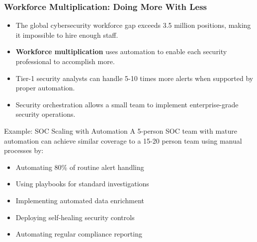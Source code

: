\documentclass{beamer}
\begin{document}
\begin{frame}
  \frametitle{Workforce Multiplication: Doing More With Less}
  
  \begin{itemize}
    \item The global cybersecurity workforce gap exceeds 3.5 million positions, making it impossible to hire enough staff.
    \item \textbf{Workforce multiplication} uses automation to enable each security professional to accomplish more.
    \item Tier-1 security analysts can handle 5-10 times more alerts when supported by proper automation.
    \item Security orchestration allows a small team to implement enterprise-grade security operations.
  \end{itemize}
  
  \begin{exampleblock}{Example: SOC Scaling with Automation}
    \scriptsize
    A 5-person SOC team with mature automation can achieve similar coverage to a 15-20 person team using manual processes by:
    \begin{itemize}
      \item Automating 80\% of routine alert handling
      \item Using playbooks for standard investigations
      \item Implementing automated data enrichment
      \item Deploying self-healing security controls
      \item Automating regular compliance reporting
    \end{itemize}
  \end{exampleblock}
\end{frame}
\end{document}
